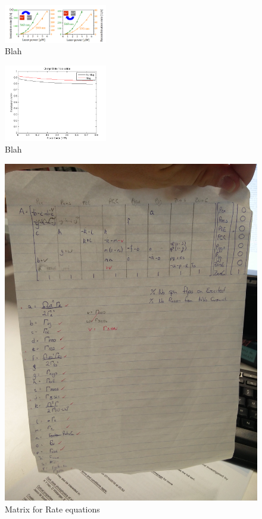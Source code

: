 \documentclass[prl]{revtex4}
\begin{document}
\begin{figure}[H]
  \centering
  \includegraphics[width=0.4\textwidth]{IonRateCompare.png} 
 \caption{Blah} 
\end{figure}

\begin{figure}[H]
  \centering
  \includegraphics[width=0.4\textwidth]{ChargeData.png} 
 \caption{Blah} 
\end{figure}


\begin{figure}[H]
  \centering
  \includegraphics[width=1\textwidth]{Matrix.jpg} 
 \caption{Matrix for Rate equations}
\end{figure}
\end{document}
